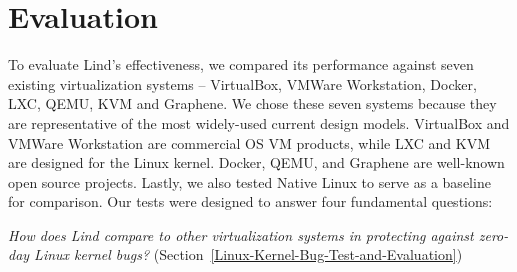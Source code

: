 \section{Evaluation}
\label{sec.evaluation}

To evaluate Lind's effectiveness,
we compared its performance against seven existing
virtualization systems -- VirtualBox, VMWare
Workstation, Docker, LXC, QEMU, KVM and Graphene.
We chose these seven systems because they are representative of the most
widely-used current design models.
VirtualBox and VMWare Workstation are commercial OS VM products, while
LXC and KVM are designed for the Linux kernel. Docker, QEMU, and Graphene are well-known open
source projects. Lastly, we also tested Native Linux to serve as a
baseline for comparison.
%
Our tests were designed to answer four fundamental questions:

\textit{How does Lind compare to other virtualization systems
in protecting against zero-day Linux kernel bugs?}
(Section~{\ref{Linux-Kernel-Bug-Test-and-Evaluation}})

